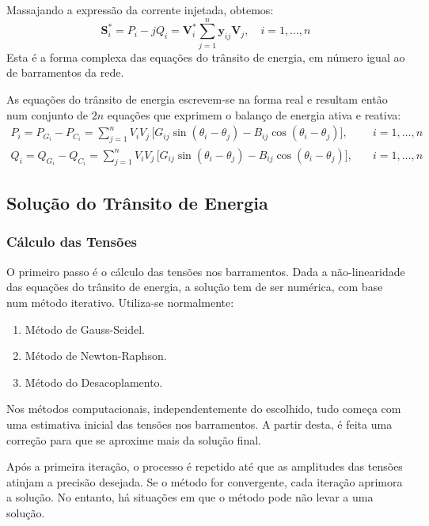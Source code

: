 \vspace{0.5em}
\noindent Massajando a expressão da corrente injetada, obtemos:
$$
    \mathbf{S}^*_i = P_i - jQ_i = \mathbf{V}_i^* \sum_{j = 1}^{n} \mathbf{y}_{ij} \mathbf{V}_j,\quad i = 1,\dots,n
$$
Esta é a forma complexa das equações do trânsito de energia, em número igual ao de barramentos da rede. 

\noindent As equações do trânsito de energia escrevem-se na forma real e resultam então num conjunto de $2n$ equações que exprimem o balanço de energia ativa e reativa:
$$
    \begin{aligned}
        P_i = P_{G_i} - P_{C_i} = \sum_{j=1}^{n} V_i V_j\, \Big[G_{ij} \sin(\theta_i - \theta_j) - B_{ij} \cos(\theta_i - \theta_j)\Big], \quad &i = 1,\dots,n \\
        Q_i = Q_{G_i} - Q_{C_i} = \sum_{j=1}^{n} V_i V_j\, \Big[G_{ij} \sin(\theta_i - \theta_j) - B_{ij} \cos(\theta_i - \theta_j)\Big], \quad &i = 1,\dots,n
    \end{aligned} 
$$

\subsection{Solução do Trânsito de Energia}

%
\subsubsection{Cálculo das Tensões}

O primeiro passo é o cálculo das tensões nos barramentos. Dada a não-linearidade das equações do trânsito de energia, a solução tem de ser numérica, com base num método iterativo. Utiliza-se normalmente:

\begin{enumerate}
    \item Método de Gauss-Seidel.
    \item Método de Newton-Raphson.
    \item Método do Desacoplamento.
\end{enumerate}

\noindent Nos métodos computacionais, independentemente do escolhido, tudo começa com uma estimativa inicial das tensões nos barramentos. A partir desta, é feita uma correção para que se aproxime mais da solução final.

Após a primeira iteração, o processo é repetido até que as amplitudes das tensões atinjam a precisão desejada. Se o método for convergente, cada iteração aprimora a solução. No entanto, há situações em que o método pode não levar a uma solução.

